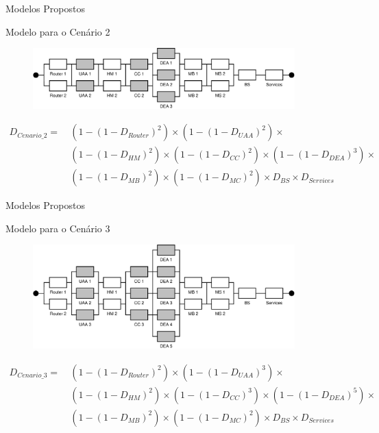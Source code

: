 \documentclass{beamer}
\begin{document}
    \begin{frame}{Modelos Propostos}
    
        Modelo para o Cenário 2
        
        \begin{figure}[ht]
            \includegraphics[width=0.9\textwidth]{img/model2}
        \end{figure}
        
        \begin{align*}
           D_{Cenario\_2}=~ & (1 - (1 - D_{Router})^2) \times (1 - (1 - D_{UAA})^2) \times \\
                            & (1 - (1 - D_{HM})^2) \times (1 - (1 - D_{CC})^2) \times (1 - (1 - D_{DEA})^3) \times  \\
                            & (1 - (1 - D_{MB})^2) \times (1 - (1 - D_{MC})^2) \times D_{BS} \times D_{Services}
        \end{align*}

    \end{frame}

    \begin{frame}{Modelos Propostos}
    
        Modelo para o Cenário 3
        
        \begin{figure}[ht]
            \includegraphics[width=0.9\textwidth]{img/model3}
        \end{figure}
        
        \begin{align*}
          D_{Cenario\_3} =~ & (1 - (1 - D_{Router})^2) \times (1 - (1 - D_{UAA})^3) \times \\
                            & (1 - (1 - D_{HM})^2) \times (1 - (1 - D_{CC})^3) \times (1 - (1 - D_{DEA})^5) \times \\
                            & (1 - (1 - D_{MB})^2) \times (1 - (1 - D_{MC})^2) \times D_{BS} \times D_{Services}
        \end{align*}

    \end{frame}
\end{document}
